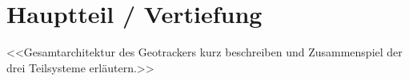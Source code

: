 
\chapter{Hauptteil / Vertiefung}
\label{chap:hauptteil}

<<Gesamtarchitektur des Geotrackers kurz beschreiben und Zusammenspiel der
drei Teilsysteme erläutern.>>







